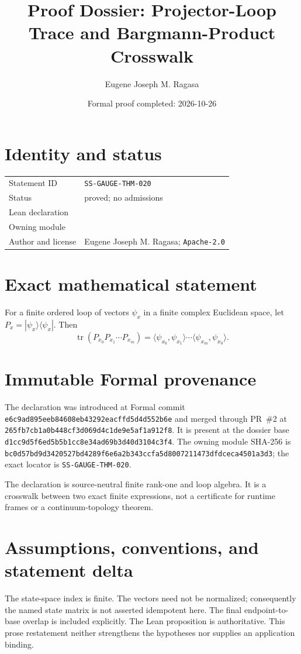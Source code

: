\documentclass[11pt]{article}
\title{Proof Dossier: Projector-Loop Trace and Bargmann-Product Crosswalk}
\author{Eugene Joseph M. Ragasa}
\date{Formal proof completed: 2026-10-26}
\begin{document}
\raggedright
\maketitle

\section{Identity and status}
\begin{tabularx}{\textwidth}{@{}lY@{}}
\toprule
Statement ID & \texttt{SS-GAUGE-THM-020} \\
Status & proved; no admissions \\
Lean declaration &  \\
Owning module &  \\
Author and license & Eugene Joseph M. Ragasa; \texttt{Apache-2.0} \\
\bottomrule
\end{tabularx}

\section{Exact mathematical statement}
For a finite ordered loop of vectors $\psi_x$ in a finite complex Euclidean space, let $P_x=|\psi_x\rangle\langle\psi_x|$.  Then
\[
 \operatorname{tr}(P_{x_0}P_{x_1}\cdots P_{x_m})
 =\langle\psi_{x_0},\psi_{x_1}\rangle\cdots
   \langle\psi_{x_m},\psi_{x_0}\rangle.
\]

\section{Immutable Formal provenance}
The declaration was introduced at Formal commit
\texttt{e6c9ad895eeb84608eb43292eacffd5d4d552b6e} and merged through PR~\#2 at
\texttt{265fb7cb1a0b448cf3d069d4c1de9e5af1a912f8}.  It is present at the dossier base
\texttt{d1cc9d5f6ed5b5b1cc8e34ad69b3d40d3104c3f4}.  The owning module SHA-256 is
\texttt{bc0d57bd9d3420527bd4289f6e6a2b343ccfa5d8007211473dfdceca4501a3d3}; the exact locator is \texttt{SS-GAUGE-THM-020}.

The declaration is source-neutral finite rank-one and loop algebra.  It is a crosswalk between two exact finite expressions, not a certificate for runtime frames or a continuum-topology theorem.

\section{Assumptions, conventions, and statement delta}
The state-space index is finite.  The vectors need not be normalized; consequently the named state matrix is not asserted idempotent here.  The final endpoint-to-base overlap is included explicitly.
The Lean proposition is authoritative.  This prose restatement neither strengthens the hypotheses
nor supplies an application binding.
\end{document}
